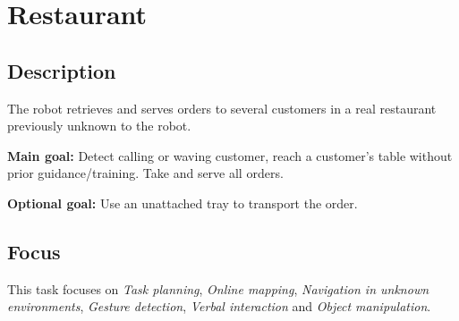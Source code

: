 \section{Restaurant}
\label{test:restaurant}

\subsection*{Description}

The robot retrieves and serves orders to several customers in a real restaurant previously unknown to the robot.

\textbf{Main goal:}
	Detect calling or waving customer, reach a customer's table without prior guidance/training. Take and serve all orders.
	
\textbf{Optional goal:}
	Use an unattached tray to transport the order.


\subsection*{Focus}
This task focuses on
\textit{Task planning},
\textit{Online mapping},
\textit{Navigation in unknown environments},
\textit{Gesture detection},
\textit{Verbal interaction} and
\textit{Object manipulation}.	

